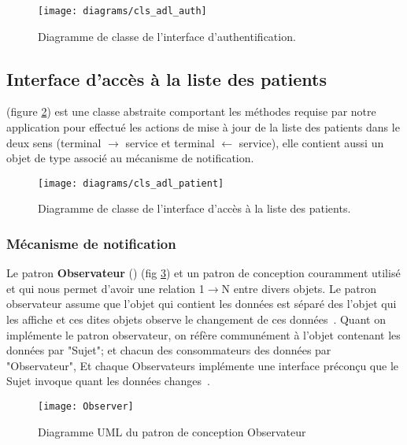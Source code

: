 \begin{figure}[H]
\center
\texttt{[image: diagrams/cls\_adl\_auth]}
\caption{Diagramme de classe de l'interface d'authentification.}
\label{fig:cls_adl_auth}
\end{figure}

\subsection{Interface d’accès à la liste des patients}

 (figure
\ref{fig:cls_adl_patient}) est une classe abstraite comportant les méthodes
requise par notre application pour effectué les actions de mise à jour de la liste des patients dans le deux sens (terminal $\rightarrow$ service et terminal $\leftarrow$ service), elle contient aussi un objet de type  associé au mécanisme de notification.

\begin{figure}[H]
\center
\texttt{[image: diagrams/cls\_adl\_patient]}
\caption{Diagramme de classe de l'interface d’accès à la liste des patients.}
\label{fig:cls_adl_patient}
\end{figure}

\subsubsection{Mécanisme de notification}

Le patron \textbf{Observateur} () (fig
\ref{fig:observer}) et un patron de conception couramment utilisé et qui
nous permet d'avoir une relation 1$\rightarrow$N entre divers objets. Le
patron observateur assume que l'objet qui contient les données est
séparé des l’objet qui les affiche et ces dites objets observe le
changement de ces données~\cite{jdp_observer}. Quant on implémente le
patron observateur, on réfère communément à l'objet contenant les
données par "Sujet"; et chacun des consommateurs des données par
"Observateur", Et chaque Observateurs implémente une interface préconçu
que le Sujet invoque quant les données changes~\cite{jdp_observer}.

\begin{figure}[H]
\center
\texttt{[image: Observer]}
\caption{Diagramme UML du patron de conception Observateur~\cite{wiki:observer}}
\label{fig:observer}
\end{figure}

